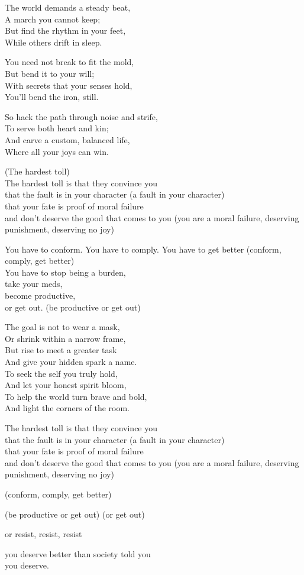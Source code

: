 \begin{lyrics}
The world demands a steady beat,\\
A march you cannot keep;\\
But find the rhythm in your feet,\\
While others drift in sleep.

You need not break to fit the mold,\\
But bend it to your will;\\
With secrets that your senses hold,\\
You'll bend the iron, still.

So hack the path through noise and strife,\\
To serve both heart and kin;\\
And carve a custom, balanced life,\\
Where all your joys can win.

(The hardest toll)\\
The hardest toll is that they convince you\\
that the fault is in your character
(a fault in your character)\\
that your fate is proof of moral failure\\
and don't deserve the good that comes to you
(you are a moral failure, deserving punishment, deserving no joy)

You have to conform. You have to comply. You have to get better
(conform, comply, get better)\\
You have to stop being a burden,\\
take your meds,\\
become productive,\\
or get out.
(be productive or get out)

The goal is not to wear a mask,\\
Or shrink within a narrow frame,\\
But rise to meet a greater task\\
And give your hidden spark a name.\\
To seek the self you truly hold,\\
And let your honest spirit bloom,\\
To help the world turn brave and bold,\\
And light the corners of the room.

The hardest toll is that they convince you\\
that the fault is in your character
(a fault in your character)\\
that your fate is proof of moral failure\\
and don't deserve the good that comes to you
(you are a moral failure, deserving punishment, deserving no joy)

(conform, comply, get better)

(be productive or get out)
(or get out)

or resist, resist, resist

you deserve better than society told you\\
you deserve.
\end{lyrics}


